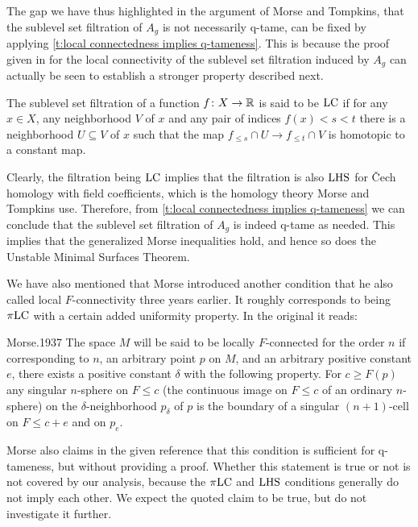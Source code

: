 The gap we have thus highlighted in the argument of Morse and Tompkins, that the sublevel set filtration of $A_g$ is not necessarily q-tame, can be fixed by applying \cref{t:local connectedness implies q-tameness}.
This is because the proof given in \cite[p.464]{Morse.1939} for the local connectivity of the sublevel set filtration induced by $A_g$ can actually be seen to establish a stronger property described next.

\begin{defi}
	The sublevel set filtration of a function $f \colon X \to \mathbb{R}$ is said to be $\mathrm{LC}$ if for any $x \in X$, any neighborhood $V$ of $x$ and any pair of indices $f(x) < s < t$ there is a neighborhood $U \subseteq V$ of $x$ such that the map $f_{\leq s} \cap U \to f_{\leq t} \cap V$ is homotopic to a constant map.
\end{defi}

Clearly, the filtration being $\mathrm{LC}$ implies that the filtration is also $\mathrm{LHS}$ for \v{C}ech homology with field coefficients, which is the homology theory Morse and Tompkins use.
Therefore, from \cref{t:local connectedness implies q-tameness} we can conclude that the sublevel set filtration of $A_g$ is indeed \mbox{q-tame} as needed.
This implies that the generalized Morse inequalities hold, and hence so does the Unstable Minimal Surfaces Theorem.

We have also mentioned that Morse introduced another condition that he also called local $F$-connectivity three years earlier.
It roughly corresponds to being $\pi\mathrm{LC}$ with a certain added uniformity property.
In the original it reads:
\begin{displaycquote}[p.421--422]{Morse.1937}
	The space $M$ will be said to be locally $F$-connected for the order $n$ if corresponding to $n$, an arbitrary point $p$ on $M$, and an arbitrary positive constant $e$, there exists a positive constant $\delta$ with the following property.
	For $c \geq F(p)$ any singular $n$-sphere on $F \leq c$ (the continuous image on $F \leq c$ of an ordinary $n$-sphere) on the $\delta$-neighborhood $p_{\delta}$ of $p$ is the boundary of a singular $(n + 1)$-cell on $F \leq c + e$ and on $p_e$.
\end{displaycquote}
Morse also claims in the given reference that this condition is sufficient for q-tameness, but without providing a proof.
Whether this statement is true or not is not covered by our analysis, because the $\pi\mathrm{LC}$ and $\mathrm{LHS}$ conditions generally do not imply each other.
We expect the quoted claim to be true, but do not investigate it further.
